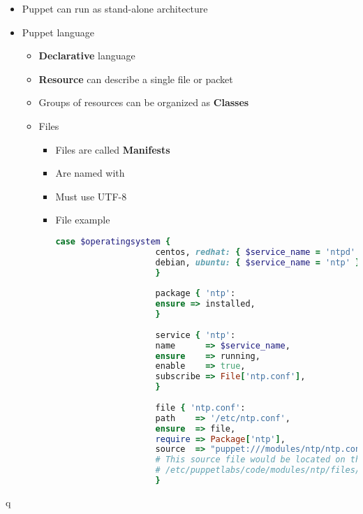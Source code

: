 \begin{itemize}
\begin{enumerate}
		\end{enumerate}
		\item Puppet can run as stand-alone architecture
		\item Puppet language
		\begin{itemize}
			\item \textbf{Declarative} language
			\item \textbf{Resource} can describe a single file or packet
			\item Groups of resources can be organized as \textbf{Classes}
			\item Files
			\begin{itemize}
				\item Files are called \textbf{Manifests}
				\item Are named with 
				\item Must use UTF-8
				\item File example
				\begin{lstlisting}[language=Ruby]
					case $operatingsystem {
					centos, redhat: { $service_name = 'ntpd' }
					debian, ubuntu: { $service_name = 'ntp' }
					}
					
					package { 'ntp':
					ensure => installed,
					}
					
					service { 'ntp':
					name      => $service_name,
					ensure    => running,
					enable    => true,
					subscribe => File['ntp.conf'],
					}
					
					file { 'ntp.conf':
					path    => '/etc/ntp.conf',
					ensure  => file,
					require => Package['ntp'],
					source  => "puppet:///modules/ntp/ntp.conf",
					# This source file would be located on the Puppet master at
					# /etc/puppetlabs/code/modules/ntp/files/ntp.conf
					}
				\end{lstlisting}
			\end{itemize}
		\end{itemize}
	\end{itemize}
q
